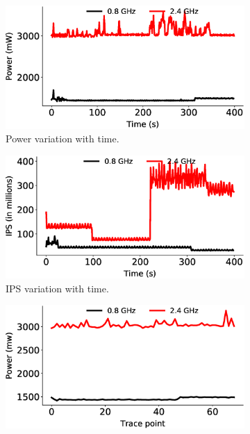 \begin{figure}[ht]
    \centering
    \begin{subfigure}{0.48\textwidth}
      \centering
        \includegraphics[width=\textwidth]{Chapter3/Figs/trace-files/new/power_orig.eps}
      \caption{Power variation with time.}
      \label{fig: powerastartime}
    \end{subfigure}
    \begin{subfigure}{0.48\textwidth}
      \centering
        \includegraphics[width=\textwidth]{Chapter3/Figs/trace-files/new/perf_orig.eps}
      \caption{IPS variation with time.}
      \label{fig: perfastartime}
    \end{subfigure} 
    \begin{subfigure}{0.48\textwidth} 
        \centering
        \includegraphics[width=\textwidth]{Chapter3/Figs/trace-files/new/power_realign.eps}

\end{subfigure}
\end{figure}
